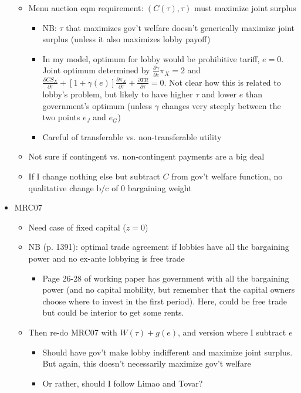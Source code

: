 \documentclass[12pt]{article}
\newcommand{\ga}{\gamma}
\begin{document}
\begin{itemize}
\begin{itemize}
				\item Menu auction eqm requirement: $(C(\tau),\tau)$ must maximize joint surplus
					\begin{itemize}
						\item NB: $\tau$ that maximizes gov't welfare doesn't generically maximize joint surplus (unless it also maximizes lobby payoff)
						\item In my model, optimum for lobby would be prohibitive tariff, $e=0$. Joint optimum determined by $\frac{\partial \ga}{\partial e}\pi_X = 2$ and $\frac{\partial CS_X}{\partial \tau} + \left[ 1 + \ga(e)\right]\frac{\partial \pi_X}{\partial \tau} + \frac{\partial TR}{\partial \tau} = 0$. Not clear how this is related to lobby's problem, but likely to have higher $\tau$ and lower $e$ than government's optimum (unless $\ga$ changes very steeply between the two points $e_J$ and $e_G$)
						\item Careful of transferable vs. non-transferable utility
					\end{itemize}
				\item Not sure if contingent vs. non-contingent payments are a big deal
				\item If I change nothing else but subtract $C$ from gov't welfare function, no qualitative change b/c of 0 bargaining weight
			\end{itemize}
		\item MRC07
			\begin{itemize}
				\item Need case of fixed capital ($z=0$)
				\item NB (p. 1391): optimal trade agreement if lobbies have all the bargaining power and no ex-ante lobbying is free trade
					\begin{itemize}
						\item Page 26-28 of working paper has government with all the bargaining power (and no capital mobility, but remember that the capital owners choose where to invest in the first period). Here, could be free trade but could be interior to get some rents.
					\end{itemize}
				\item Then re-do MRC07 with $W(\tau) + g(e)$, and version where I subtract $e$
					\begin{itemize}
						\item Should have gov't make lobby indifferent and maximize joint surplus. But again, this doesn't necessarily maximize gov't welfare
						\item Or rather, should I follow Limao and Tovar?
					\end{itemize}
			\end{itemize}
	\end{itemize}
\end{document}
